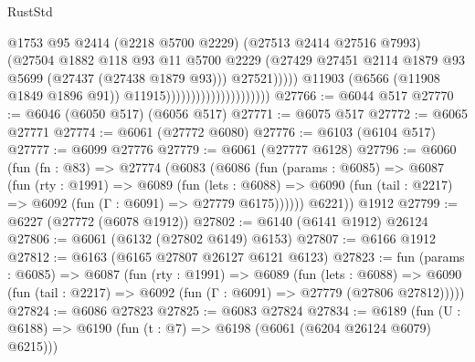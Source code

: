\begin{lexlean}{RustStd}
\begin{coremodule}
                                                      @1753
                                                      @95
                                                      @2414
                                                      (@2218 @5700 @2229)
                                                      (@27513 @2414 @27516 @7993)
                                                      (@27504
                                                        @1882
                                                        @118
                                                        @93
                                                        @11
                                                        @5700
                                                        @2229
                                                        (@27429
                                                          @27451
                                                          @2114
                                                          @1879
                                                          @93
                                                          @5699
                                                          (@27437 (@27438 @1879 @93)))
                                                        @27521)))))
                                              @11903
                                              (@6566 (@11908 @1849 @1896 @91))
                                              @11915)))))))))))))))))))))
@27766 := @6044 @517
@27770 := @6046 (@6050 @517) (@6056 @517)
@27771 := @6075 @517
@27772 := @6065 @27771
@27774 := @6061 (@27772 @6080)
@27776 := @6103 (@6104 @517)
@27777 := @6099 @27776
@27779 := @6061 (@27777 @6128)
@27796 := @6060
    (fun (fn : @83) =>
    @27774
      (@6083
        (@6086
          (fun (params : @6085) =>
          @6087
            (fun (rty : @1991) =>
            @6089
              (fun (lets : @6088) =>
              @6090 (fun (tail : @2217) => @6092 (fun (Γ : @6091) => @27779 @6175))))))
        @6221))
    @1912
@27799 := @6227 (@27772 (@6078 @1912))
@27802 := @6140 (@6141 @1912) @26124
@27806 := @6061 (@6132 (@27802 @6149) @6153)
@27807 := @6166 @1912
@27812 := @6163 (@6165 @27807 @26127 @6121 @6123)
@27823 := fun (params : @6085) =>
  @6087
    (fun (rty : @1991) =>
    @6089
      (fun (lets : @6088) =>
      @6090 (fun (tail : @2217) => @6092 (fun (Γ : @6091) => @27779 (@27806 @27812)))))
@27824 := @6086 @27823
@27825 := @6083 @27824
@27834 := @6189
    (fun (U : @6188) => @6190 (fun (t : @7) => @6198 (@6061 (@6204 @26124 @6079) @6215)))

\end{coremodule}
\end{lexlean}
